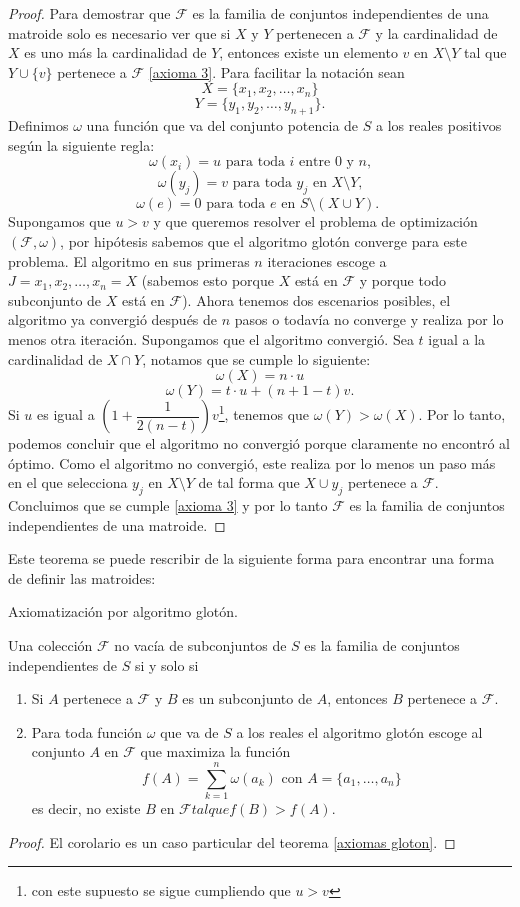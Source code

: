 \begin{proof}
Para demostrar que $\mathcal{F}$ es la familia de conjuntos independientes de una matroide solo es necesario ver que si $X$ y $Y$ pertenecen a $\mathcal{F}$ y la cardinalidad de $X$ es uno más la cardinalidad de $Y$, entonces existe un elemento $v$ en $X \setminus Y$ tal que $Y \cup \{v\} $ pertenece a $\mathcal{F}$ \ref{axioma 3}. Para facilitar la notación sean 
$$X = \{x_1,x_2,\dots,x_n \}$$ $$Y = \{y_1,y_2,\dots,y_{n+1}\}.$$
Definimos $\omega$ una función que va del conjunto potencia de $S$ a los reales positivos según la siguiente regla:
$$\omega(x_i)=u \text{ para toda $i$ entre $0$ y $n$,}$$
$$\omega(y_j)=v \text{ para toda $y_j$ en $X \setminus Y$,}$$
$$\omega(e)=0 \text{ para toda $e$ en $S \setminus(X \cup Y)$. }$$
Supongamos que $u>v$ y que queremos resolver el problema de optimización $(\mathcal{F}, \omega)$, por hipótesis sabemos que el algoritmo glotón converge para este problema. El algoritmo en sus primeras $n$ iteraciones escoge a $J={x_1,x_2,\dots,x_n}=X$ (sabemos esto porque $X$ está en $\mathcal{F}$ y porque todo subconjunto de $X$ está en $\mathcal{F}$). Ahora tenemos dos escenarios posibles, el algoritmo ya convergió después de $n$ pasos o todavía no converge y realiza por lo menos otra iteración. 
Supongamos que el algoritmo convergió. Sea $t$ igual a la cardinalidad de $X \cap Y$, notamos que se cumple lo siguiente:
$$\omega(X)= n\cdot u$$
$$\omega(Y) = t \cdot u + (n+1-t)v.$$
Si $u$ es igual a $\left(1+\dfrac{1}{2(n-t)}\right)v$\footnote{con este supuesto se sigue cumpliendo que $u>v$}, tenemos que $ \omega(Y) > \omega(X)$. Por lo tanto, podemos concluir que el algoritmo no convergió porque claramente no encontró al óptimo. Como el algoritmo no convergió, este realiza por lo menos un paso más en el que selecciona $y_j$ en $X \setminus Y$ de tal forma que $X \cup {y_j}$ pertenece a $\mathcal{F}$. Concluimos que se cumple \ref{axioma 3} y por lo tanto $\mathcal{F}$ es la familia de conjuntos independientes de una matroide. 
\end{proof}

Este teorema se puede rescribir de la siguiente forma para encontrar una forma de definir las matroides:

\begin{cor}{Axiomatización por algoritmo glotón.}

Una colección $\mathcal{F}$ no vacía de subconjuntos de $S$ es la familia de conjuntos independientes de $S$ si y solo si 
\begin{enumerate}
\item Si $A$ pertenece a $\mathcal{F}$ y $B$ es un subconjunto de $A$, entonces $B$ pertenece a $\mathcal{F}$.
\item Para toda función $\omega$ que va de $S$ a los reales el algoritmo glotón escoge al conjunto $A$ en $\mathcal{F}$ que maximiza la función 
$$f(A) = \sum_{k=1}^{n}\omega(a_k) \text{ con } A=\{a_1,\dots,a_n\}$$ es decir, no existe $B$ en $\mathcal{F} tal que f(B)>f(A)$.
\end{enumerate}
\end{cor}

\begin{proof}
El corolario es un caso particular del teorema \ref{axiomas gloton}.
\end{proof}



